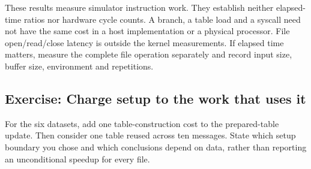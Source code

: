 These results measure simulator instruction work. They establish neither elapsed-time
ratios nor hardware cycle counts. A branch, a table load and a syscall need not have
the same cost in a host implementation or a physical processor. File open/read/close
latency is outside the kernel measurements. If elapsed time matters, measure the complete
file operation separately and record input size, buffer size, environment and repetitions.

\subsection*{Exercise: Charge setup to the work that uses it}
For the six datasets, add one table-construction cost to the prepared-table update.
Then consider one table reused across ten messages. State which setup boundary you
chose and which conclusions depend on data, rather than reporting an unconditional
speedup for every file.
